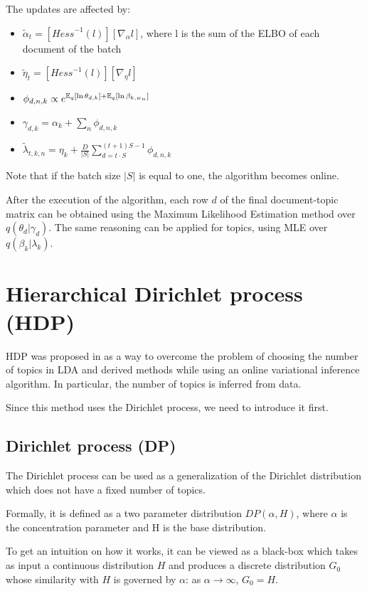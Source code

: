 The updates are affected by:
\begin{itemize}
    \item $\tilde{\alpha}_t = [\mathit{Hess}^{-1}(l)] [\nabla_{\alpha} l]$, where l is the sum of the ELBO of each document of the batch
    \item $\tilde{\eta}_t = [\mathit{Hess}^{-1}(l)] [\nabla_{\eta} l]$
    \item $\phi_{d,n,k} \propto e^{\operatorname*{\mathbb{E}}_q[\ln \theta_{d,k}] + \operatorname*{\mathbb{E}}_q[\ln \beta_{k, w_n}]}$
    \item $\gamma_{d,k} = \alpha_k + \sum_n \phi_{d,n,k}$
    \item $\tilde{\lambda}_{t,k,n} = \eta_k + \frac{D}{|S|} \sum_{d = t \cdot S}^{(t+1) S - 1} \phi_{d,n,k} $
\end{itemize}

Note that if the batch size $|S|$ is equal to one, the algorithm becomes online.

After the execution of the algorithm, each row $d$ of the final document-topic matrix
can be obtained using the Maximum Likelihood Estimation method over $q(\theta_d | \gamma_d)$.
The same reasoning can be applied for topics, using MLE over $q(\beta_k | \lambda_k)$.


\section{Hierarchical Dirichlet process (HDP)}

HDP was proposed in \cite{DBLP:journals/jmlr/WangPB11} as a way to overcome the problem of choosing the number of topics in LDA and derived methods
while using an online variational inference algorithm.
In particular, the number of topics is inferred from data.

Since this method uses the Dirichlet process, we need to introduce it first.

\subsection{Dirichlet process (DP)} \label{dipro}
The Dirichlet process can be used as a generalization of the Dirichlet distribution
which does not have a fixed number of topics.

Formally, it is defined as a two parameter distribution $\mathit{DP}(\alpha, H)$,
where $\alpha$ is the concentration parameter and H is the base distribution.

To get an intuition on how it works, it can be viewed as a black-box
which takes as input a continuous distribution $H$ and produces a discrete distribution $G_0$
whose similarity with $H$ is governed by $\alpha$: as $\alpha \to \infty$, $G_0 = H$.

